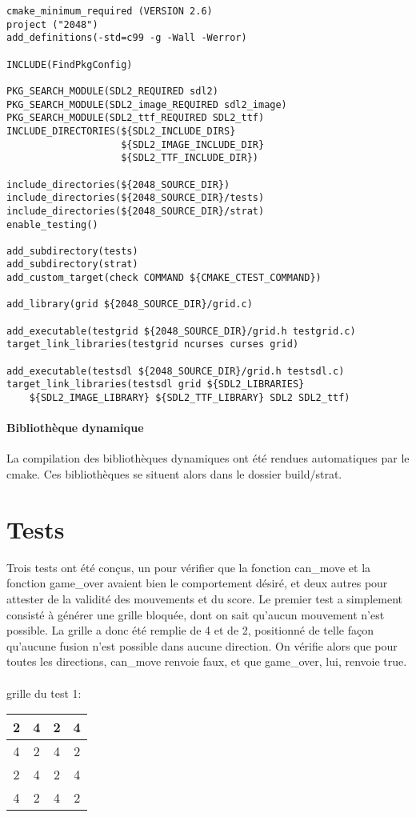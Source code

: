 \documentclass{report}
\begin{document}
\begin{lstlisting}
cmake_minimum_required (VERSION 2.6)
project ("2048")
add_definitions(-std=c99 -g -Wall -Werror)

INCLUDE(FindPkgConfig)

PKG_SEARCH_MODULE(SDL2_REQUIRED sdl2)
PKG_SEARCH_MODULE(SDL2_image_REQUIRED sdl2_image)
PKG_SEARCH_MODULE(SDL2_ttf_REQUIRED SDL2_ttf)
INCLUDE_DIRECTORIES(${SDL2_INCLUDE_DIRS} 
					${SDL2_IMAGE_INCLUDE_DIR} 
					${SDL2_TTF_INCLUDE_DIR})

include_directories(${2048_SOURCE_DIR})
include_directories(${2048_SOURCE_DIR}/tests)
include_directories(${2048_SOURCE_DIR}/strat)
enable_testing()

add_subdirectory(tests)
add_subdirectory(strat)
add_custom_target(check COMMAND ${CMAKE_CTEST_COMMAND})

add_library(grid ${2048_SOURCE_DIR}/grid.c)

add_executable(testgrid ${2048_SOURCE_DIR}/grid.h testgrid.c)
target_link_libraries(testgrid ncurses curses grid)

add_executable(testsdl ${2048_SOURCE_DIR}/grid.h testsdl.c)
target_link_libraries(testsdl grid ${SDL2_LIBRARIES}
	${SDL2_IMAGE_LIBRARY} ${SDL2_TTF_LIBRARY} SDL2 SDL2_ttf)
\end{lstlisting}

\paragraph{Bibliothèque dynamique}
La compilation des bibliothèques dynamiques ont été rendues automatiques par le cmake. Ces bibliothèques se situent alors dans le dossier build/strat.

\section*{Tests}
Trois tests ont été conçus, un pour vérifier que la fonction can{\_}move et la fonction game{\_}over avaient bien le comportement désiré, et deux autres pour attester de la validité des mouvements et du score.
Le premier test a simplement consisté à générer une grille bloquée, dont on sait qu'aucun mouvement n'est possible. La grille a donc été remplie de 4 et de 2, positionné de telle façon qu'aucune fusion n'est possible dans aucune direction. On vérifie alors que pour toutes les directions, can{\_}move renvoie faux, et que game{\_}over, lui, renvoie true.

\paragraph{}grille du test 1: 
\begin{tabular}{|c|c|c|c|}
  \hline
  2& 4 & 2& 4\\
  \hline
  4 & 2 & 4 & 2 \\
  \hline
  2& 4 & 2& 4\\
  \hline
  4 & 2 & 4 & 2 \\
  \hline
\end{tabular}
\end{document}
